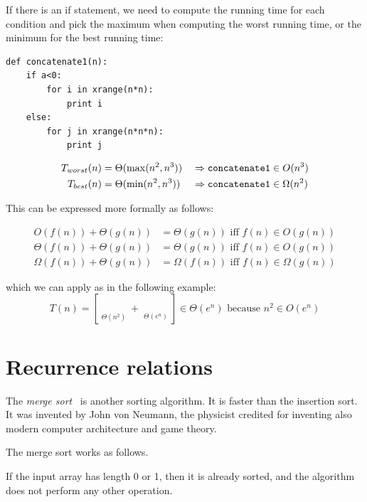 \documentclass[justified,sixbynine]{tufte-book}
\def\stackunder#1#2{\mathrel{\mathop{#2}\limits_{#1}}}
\theoremstyle{plain}%
\theoremstyle{definition}
\theoremstyle{remark}
\begin{document}
\begin{fullwidth}
If there is an if statement, we need to compute the running time for each condition and pick the maximum when computing the worst running time, or the minimum for the best running time:

\begin{lstlisting}
def concatenate1(n):
    if a<0:
        for i in xrange(n*n):
            print i
    else:
        for j in xrange(n*n*n):
            print j
\end{lstlisting}

\begin{alignat}{2}
T_{worst}(n) &= \Theta (\max (n^2,n^3)) &&\Rightarrow \text{{\tt concatenate1}}\in O(n^3) \\
T_{best}(n) &= \Theta (\min (n^2,n^3)) &&\Rightarrow \text{{\tt concatenate1}}\in \Omega(n^2)
\end{alignat}

This can be expressed more formally as follows:

\begin{align}
O(f(n))+\Theta (g(n)) &= \Theta (g(n))\text{ iff }f(n)\in O(g(n)) \\
\Theta (f(n))+\Theta (g(n)) &= \Theta (g(n))\text{ iff }f(n)\in O(g(n)) \\
\Omega (f(n))+\Theta (g(n)) &= \Omega (f(n))\text{ iff }f(n)\in \Omega (g(n))
\end{align}

which we can apply as in the following example:
\begin{equation}
T(n)=[\stackunder{\Theta (n^2)}{\underbrace{n^2+n+3}}+\stackunder{\Theta
(e^n)}{\underbrace{e^n-\log n}}]\in \Theta (e^n)\text{ because }n^2\in
O(e^n)
\end{equation}

\goodbreak\section{Recurrence relations}



The {\it merge sort}~\cite{mergesort} is another sorting algorithm. It is faster than the insertion sort. It was invented by John von Neumann, the physicist credited for inventing also modern computer architecture and game theory.

The merge sort works as follows.

If the input array has length 0 or 1, then it is already sorted, and the algorithm does not perform any other operation.


\end{fullwidth}
\end{document}
